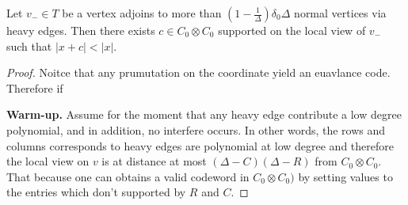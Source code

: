 \begin{claim}
  Let $v_{-} \in T$ be a vertex adjoins to more than $\left( 1 - \frac{1}{\Delta} \right)\delta_{0}\Delta$ normal vertices via heavy edges. Then there exists $c \in C_{0} \otimes C_{0}$ supported on the local view of $v_{-}$ such that $|x + c| < |x|$. 
\end{claim}

\begin{proof}
  Noitce that any prumutation on the coordinate yield an euavlance code. Therefore if      

  \begin{center}
\end{center}


\textbf{Warm-up.} Assume for the moment that any heavy edge contribute a low degree polynomial, and in addition, no interfere occurs. In other words, the rows and columns corresponds to heavy edges are polynomial at low degree and therefore the local view on $v$ is at distance at most $ \left( \Delta - C \right)\left( \Delta - R \right) $ from $C_{0}\otimes C_{0}$. That because one can obtains a valid codeword in $C_{0}\otimes C_{0})$ by setting values to the entries which don't supported by $R$ and $C$.  


\end{proof}

